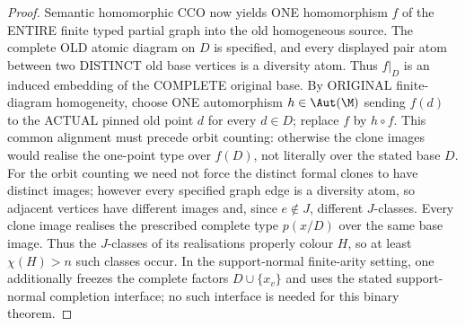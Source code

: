 \begin{proof}
Semantic homomorphic CCO now yields ONE
homomorphism $f$ of the ENTIRE finite typed
partial graph into the old homogeneous source.
The complete OLD atomic diagram on $D$ is
specified, and every displayed pair atom
between two DISTINCT old base vertices is a
diversity atom. Thus $f|_D$ is an induced
embedding of the COMPLETE original base.
By ORIGINAL finite-diagram homogeneity,
choose ONE automorphism $h\in\Aut(\M)$
sending $f(d)$ to the ACTUAL pinned old
point $d$ for every $d\in D$; replace
$f$ by $h\circ f$. This common alignment
must precede orbit counting: otherwise
the clone images would realise the
one-point type over $f(D)$, not
literally over the stated base $D$.
For the orbit counting we need not force the
distinct formal clones to have distinct images;
however every specified graph edge is a
diversity atom, so adjacent vertices have
different images and, since \(e\notin J\),
different \(J\)-classes. Every clone image
realises the prescribed complete type
\(p(x/D)\) over the same base image.
Thus the \(J\)-classes of its realisations
properly colour \(H\), so at least
\(\chi(H)>n\) such classes occur.
In the support-normal finite-arity setting,
one additionally freezes the complete factors
\(D\cup\{x_v\}\) and uses the stated
support-normal completion interface;
no such interface is needed for this
binary theorem.
\end{proof}

